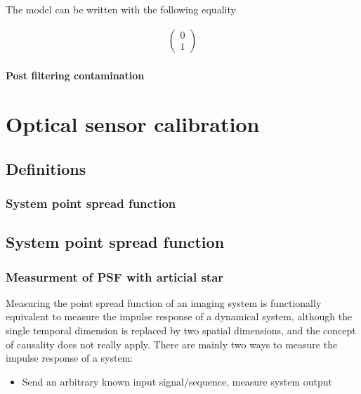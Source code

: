 \documentclass{article}
\begin{document}
    The model can be written with the following equality
    
    \begin{align*}
     \begin{pmatrix}
      0 \\
      1
     \end{pmatrix}
    \end{align*}

    
    
    \paragraph{Post filtering contamination}
    
    
    






\section{Optical sensor calibration}
  \subsection{Definitions}
    \subsubsection{System point spread function}

  \subsection{System point spread function}
    \subsubsection{Measurment of PSF with articial star}
      Measuring the point spread function of an imaging system is functionally equivalent to measure the impulse response of a dynamical system, although the single temporal dimension is replaced by two spatial dimensions, and the concept of  causality does not really apply.
      There are mainly two ways to measure the impulse response of a system:
      \begin{itemize}
      \item Send an arbitrary known input signal/sequence, measure system output
      \end{itemize}
\end{document}
